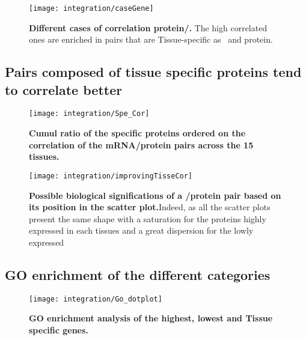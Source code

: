 \begin{figure}[!htbp]
\texttt{[image: integration/caseGene]}\centering
    \caption[Different cases of correlation
    protein/mRNA]{\label{fig:caseGene}\textbf{Different cases of correlation
    protein/\mRNA.} The high correlated ones are enriched in pairs that are
    Tissue-specific as \mRNA\ and protein.}
\end{figure}

\subsection{Pairs composed of tissue specific proteins tend to correlate better}

\begin{figure}[!htbp]
    \texttt{[image: integration/Spe\_Cor]}\centering
    \caption[Cumul ratio of the specific proteins ordered on the correlation
    of the mRNA/protein pairs across the 15
    tissues]{\label{fig:Spe_Cor}\textbf{Cumul ratio of the specific proteins
    ordered on the correlation of the mRNA/protein pairs across the 15 tissues.}}
\end{figure}




\begin{figure}[!htbp]
    \texttt{[image: integration/improvingTisseCor]}\centering
    \caption[Possible biological significations of a \mRNA/protein pair based on
    its possition in the scatter plot]
    {\label{fig:CorImprovable}\textbf{Possible biological significations of a
    \mRNA/protein pair based on its position in the scatter plot.}Indeed, as all
    the scatter plots present the same shape with a saturation for the proteins
    highly expressed in each tissues and a great dispersion for the lowly
    expressed \mRNAs}
\end{figure}


\subsection{GO enrichment of the different categories}


\begin{figure}[!htbp]
\texttt{[image: integration/Go\_dotplot]}\centering
    \caption[GO enrichment analysis of the highest, lowest and Tissue
    specific genes]{\label{fig:Go_dotplot}\textbf{GO enrichment analysis of the
    highest, lowest and Tissue specific genes.}}
\end{figure}


